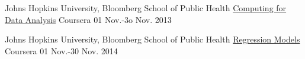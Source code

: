 \begin{cventries}
\vspace{-.5\baselineskip}
  \cventry
    {Johns Hopkins University, Bloomberg School of Public Health} %
    {\href{https://www.dropbox.com/sh/6blkx73x48i2en6/AABbH5fj5bXJOIOPt-fFkQDga?dl=0}{Computing for Data Analysis}} %
    {Coursera} %
    {01 Nov.-3o Nov. 2013} %
    {
    }


\vspace{-.5\baselineskip}
  \cventry
    {Johns Hopkins University, Bloomberg School of Public Health} %
    {\href{https://www.coursera.org/account/accomplishments/verify/J4QR6JEATT}{Regression Models}} %
    {Coursera} %
    {01 Nov.-30 Nov. 2014} %
    {
    }
\end{cventries}
